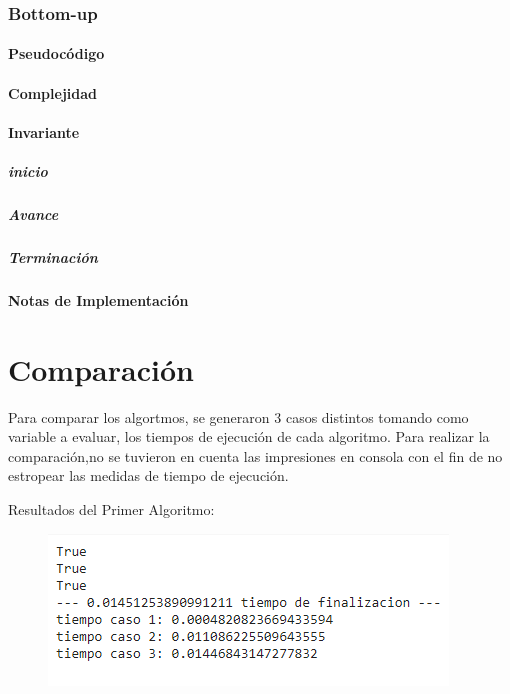 \documentclass[]{article}
\numberwithin{equation}{section}
\numberwithin{figure}{section}
\theoremstyle{definition}
\begin{document}
\section*{Bottom-up}

	\subsection*{Pseudocódigo}
	
	\subsection*{Complejidad}
	
	\subsection*{Invariante}
	
	\subsubsection*{inicio}
	\subsubsection*{Avance}
	\subsubsection*{Terminación}
	
	\subsection*{Notas de Implementación}
	
	

\part*{Comparación}

\text Para comparar los algortmos, se generaron 3 casos distintos tomando como variable a evaluar, los tiempos de ejecución de cada algoritmo. Para realizar la comparación,no se tuvieron en cuenta las impresiones en consola con el fin de no estropear las medidas de tiempo de ejecución.

\text Resultados del Primer Algoritmo:

\begin{figure}[H]
	\includegraphics{Algoritmo 1}
    \centering
\end{figure}
\end{document}
